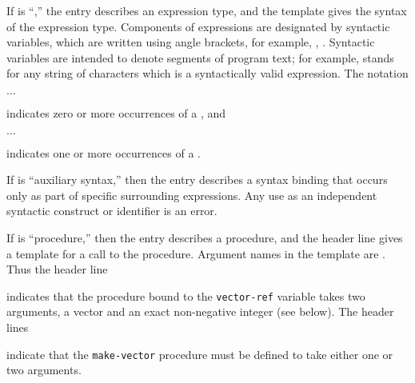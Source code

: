 If  is ``\exprtype,'' the entry describes an expression
type, and the template gives the syntax of the expression type.
Components of expressions are designated by syntactic variables, which
are written using angle brackets, for example, ,
.  Syntactic variables are intended to denote segments of
program text; for example,  stands for any string of
characters which is a syntactically valid expression.  The notation
\begin{tabbing}
\qquad {} $\ldots$
\end{tabbing}
indicates zero or more occurrences of a , and
\begin{tabbing}
\qquad {}  $\ldots$
\end{tabbing}
indicates one or more occurrences of a .

If  is ``auxiliary syntax,'' then the entry describes a
syntax binding that occurs only as part of specific surrounding
expressions. Any use as an independent syntactic construct or
identifier is an error.

If  is ``procedure,'' then the entry describes a procedure, and
the header line gives a template for a call to the procedure.  Argument
names in the template are .  Thus the header line

\noindent{}\unpenalty

indicates that the procedure bound to the {\tt vector-ref} variable takes
two arguments, a vector  and an exact non-negative integer
 (see below).  The header lines

\noindent%
\unpenalty

indicate that the {\tt make-vector} procedure must be defined to take
either one or two arguments.

